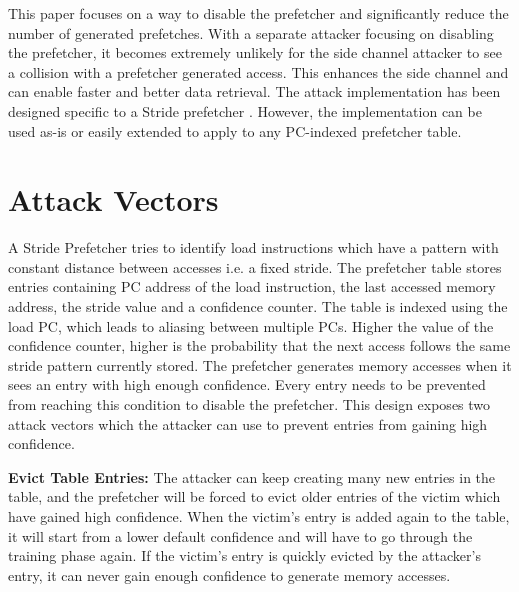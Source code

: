 \documentclass[conference]{IEEEtran}
\begin{document}
This paper focuses on a way to disable the prefetcher and significantly reduce
the number of generated prefetches. With a separate attacker focusing on disabling
the prefetcher, it becomes extremely unlikely for the side channel attacker to
see a collision with a prefetcher generated access. This enhances the side channel
and can enable faster and better data retrieval.
The attack implementation has been designed specific to a Stride prefetcher
\cite{fu-stride}. However, the implementation can be used as-is or easily extended
to apply to any PC-indexed prefetcher table.


\section{Attack Vectors}

A Stride Prefetcher tries to identify load instructions which have
a pattern with constant distance between accesses i.e. a fixed stride.
The prefetcher table stores entries containing PC address of the load
instruction, the last accessed memory address, the stride
value and a confidence counter. The table is indexed using the load PC,
which leads to aliasing between multiple PCs.
Higher the value of the confidence counter, higher is the probability that
the next access follows the same stride pattern currently stored.
The prefetcher generates memory accesses when it sees an entry with high
enough confidence. Every entry needs to be prevented from reaching this condition
to disable the prefetcher. This design exposes two attack vectors which the
attacker can use to prevent entries from gaining high confidence.

\textbf{Evict Table Entries:} The attacker can keep creating many new entries
in the table, and the prefetcher will be forced to evict older entries
of the victim which have gained high confidence. When the victim's entry is added
again to the table, it will start from a lower default confidence and will have
to go through the training phase again. If the victim's entry is quickly
evicted by the attacker's entry, it can never gain enough confidence to
generate memory accesses.
\end{document}
